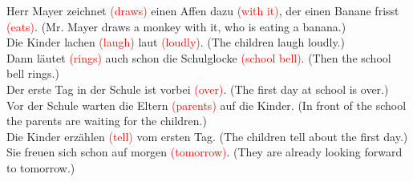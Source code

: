 \documentclass{article}
\begin{document}
\begin{enumerate}
    Herr Mayer zeichnet \textcolor{red}{(draws)} einen Affen dazu \textcolor{red}{(with it)}, der einen Banane frisst \textcolor{red}{(eats)}. (Mr. Mayer draws a monkey with it, who is eating a banana.) \\
    Die Kinder lachen \textcolor{red}{(laugh)} laut \textcolor{red}{(loudly)}. (The children laugh loudly.) \\
    Dann läutet \textcolor{red}{(rings)} auch schon die Schulglocke \textcolor{red}{(school bell)}. (Then the school bell rings.) \\
    Der erste Tag in der Schule ist vorbei \textcolor{red}{(over)}. (The first day at school is over.) \\
    Vor der Schule warten die Eltern \textcolor{red}{(parents)} auf die Kinder. (In front of the school the parents are waiting for the children.) \\
    Die Kinder erzählen \textcolor{red}{(tell)} vom ersten Tag. (The children tell about the first day.) \\
    Sie freuen sich schon auf morgen \textcolor{red}{(tomorrow)}. (They are already looking forward to tomorrow.)


\end{enumerate}
\end{document}

